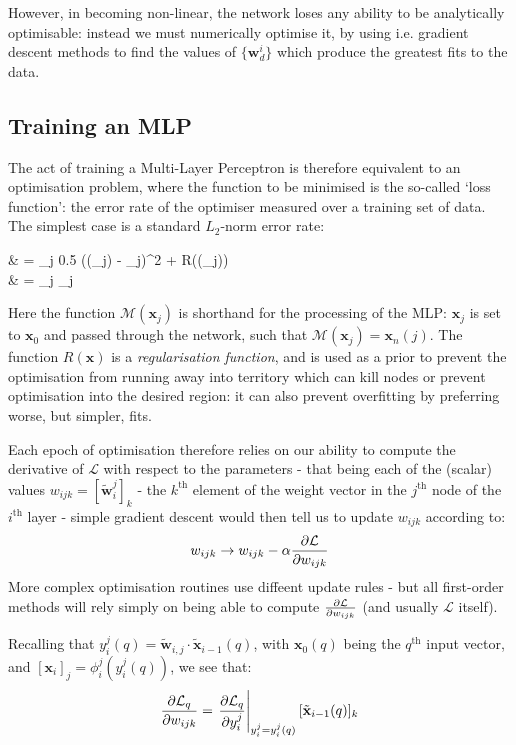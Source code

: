 \documentclass[10pt, twocolumn]{article}
\renewcommand\vec[1]{\boldsymbol{\textbf{#1}}}
\newcommand\cec[1]{\tilde{\vec{#1}}}
\begin{document}
		However, in becoming non-linear, the network loses any ability to be analytically optimisable: instead we must numerically optimise it, by using i.e. gradient descent methods to find the values of $\{ \vec{w}_d^i\}$ which produce the greatest fits to the data. 

		

	\subsection{Training an MLP}

		The act of training a Multi-Layer Perceptron is therefore equivalent to an optimisation problem, where the function to be minimised is the so-called `loss function': the error rate of the optimiser measured over a training set of data. The simplest case is a standard $L_2$-norm error rate:
		\begin{spalign}
			 & = \sum_{j} 0.5 \left((\vec{x}_j) - \vec{d}_j\right)^2 + R((\vec{x}_j))
			\\
			& = \sum_{j} _j
		\end{spalign}
		Here the function $\mathcal{M}(\vec{x}_j)$ is shorthand for the processing of the MLP: $\vec{x}_j$ is set to $\vec{x}_0$ and passed through the network, such that $\mathcal{M}(\vec{x}_j)=\vec{x}_n(j) $. The function $R(\vec{x})$ is a \textit{regularisation function}, and is used as a prior to prevent the optimisation from running away into territory which can kill nodes or prevent optimisation into the desired region: it can also prevent overfitting by preferring worse, but simpler, fits. 

		Each epoch of optimisation therefore relies on our ability to compute the derivative of $\mathcal{L}$ with respect to the parameters - that being each of the (scalar) values $w_{ijk} = [\cec{w}_i^j]_k$ - the $k^\text{th}$ element of the weight vector in the $j^\text{th}$ node of the $i^\text{th}$ layer - simple gradient descent would then tell us to update $w_{ijk}$ according to:
		\begin{equation}
			w_{ijk} \to w_{ijk} - \alpha \frac{\partial \mathcal{L}}{\partial w_{ijk}}
		\end{equation}
		More complex optimisation routines use diffeent update rules - but all first-order methods will rely simply on being able to compute $\frac{\partial \mathcal{L}}{\partial w_{ijk}}$ (and usually $\mathcal{L}$ itself).

		Recalling that $y_i^j(q) = \cec{w}_{i,j} \cdot \cec{x}_{i-1}(q)$, with $\vec{x}_0(q)$ being the $q^\text{th}$ input vector, and $[\vec{x}_i]_j = \phi_i^j(y_i^j(q))$, we see that:
		\begin{equation}
			\pdiv{\mathcal{L}_q}{w_{ijk}} = \left. \pdiv{\mathcal{L}_q}{y_i^j} \right|_{y_i^j = y_i^j(q)}[\cec{x}_{i-1}(q)]_k \label{E:BaseDerivative}
		\end{equation}
\end{document}
